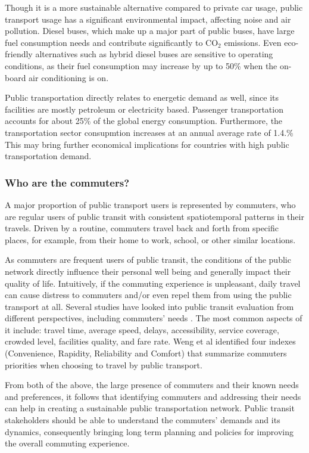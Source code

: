 \documentclass{article}
\begin{document}
Though it is a more sustainable alternative compared to private car usage, public transport usage has a significant environmental impact, affecting noise and air pollution. Diesel buses, which make up a major part of public buses, have large fuel consumption needs and contribute significantly to CO$_{2}$ emissions. Even eco-friendly alternatives such as hybrid diesel buses are sensitive to operating conditions, as their fuel consumption may increase by up to 50\% when the on-board air conditioning is on.\cite{zhang2014real}

Public transportation directly relates to energetic demand as well, since its facilities are mostly petroleum or electricity based. Passenger transportation accounts for about 25\% of the global energy consumption. Furthermore, the transportation sector consupmtion increases at an annual average rate of 1.4.\% \cite{eia2016energy} This may bring further economical implications for countries with high public transportation demand.

\subsubsection{Who are the commuters?}
A major proportion of public transport users is represented by commuters, who are regular users of public transit with consistent spatiotemporal patterns in their travels. Driven by a routine, commuters travel back and forth from specific places, for example, from their home to work, school, or other similar locations. 

As commuters are frequent users of public transit, the  conditions of the public network directly influence their personal well being and generally impact their quality of life. Intuitively, if the commuting experience is unpleasant, daily travel can cause distress to commuters and/or even repel them from using the public transport at all. Several studies have looked into public transit evaluation from different perspectives, including commuters' needs \cite{mao2016commuting}. The most common aspects of it include: travel time, average speed, delays, accessibility, service coverage, crowded level, facilities quality, and fare rate. Weng et al \cite{weng2013bus} identified four indexes (Convenience, Rapidity, Reliability and Comfort) that summarize commuters priorities when choosing to travel by public transport.
 
From both of the above, the large presence of commuters and their known needs and preferences, it follows that identifying commuters and addressing their needs can help in creating a sustainable public transportation network. Public transit stakeholders should be able to understand the commuters' demands and its dynamics, consequently bringing long term planning and policies for improving the overall commuting experience.
\end{document}
